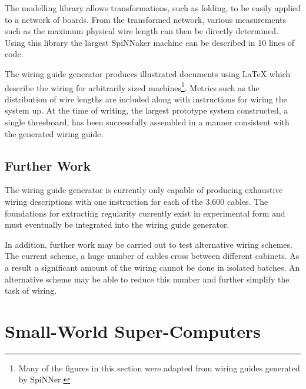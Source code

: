 			The modelling library allows transformations, such as folding, to be
			easily applied to a network of boards. From the transformed network,
			various measurements such as the maximum physical wire length can then be
			directly determined. Using this library the largest SpiNNaker machine can
			be described in 10 lines of code.
			
			The wiring guide generator produces illustrated documents using \LaTeX{}
			which describe the wiring for arbitrarily sized machines\footnote{Many of
			the figures in this section were adapted from wiring guides generated by
			SpiNNer.}. Metrics such as the distribution of wire lengths are included
			along with instructions for wiring the system up. At the time of writing,
			the largest prototype system constructed, a single threeboard, has been
			successfully assembled in a manner consistent with the generated wiring
			guide.
		
		\subsection{Further Work}
			
			
			The wiring guide generator is currently only capable of producing
			exhaustive wiring descriptions with one instruction for each of the 3,600
			cables. The foundations for extracting regularity currently exist in
			experimental form and must eventually be integrated into the wiring guide
			generator.
			
			In addition, further work may be carried out to test alternative wiring
			schemes. The current scheme, a huge number of cables cross between
			different cabinets. As a result a significant amount of the wiring cannot
			be done in isolated batches. An alternative scheme may be able to reduce
			this number and further simplify the task of wiring.
	
	\section{Small-World Super-Computers}
		
		\label{sec:small-world-super-computers}
		
		
